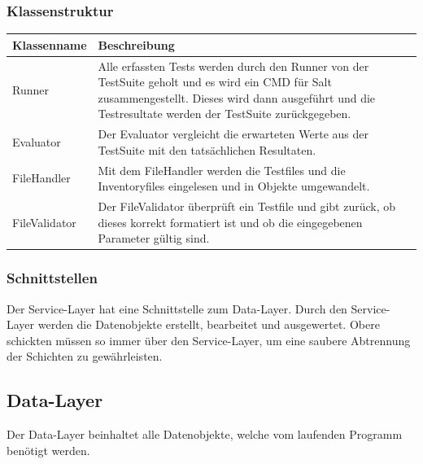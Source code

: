 \documentclass[a4,12pt]{scrartcl}
\begin{document}
\subsubsection{Klassenstruktur}
\begin{table}[H]
\centering
    \begin{tabular}{@{}l p{11cm} @{}}\toprule    
    {Klassenname} & {Beschreibung}\\ \midrule
    
    Runner & Alle erfassten Tests werden durch den Runner von der TestSuite geholt und es wird ein CMD für Salt zusammengestellt. Dieses wird dann ausgeführt und die Testresultate werden der TestSuite zurückgegeben.  \\       
    Evaluator & Der Evaluator vergleicht die erwarteten Werte aus der TestSuite mit den tatsächlichen Resultaten. \\
    FileHandler & Mit dem FileHandler werden die Testfiles und die Inventoryfiles eingelesen und in Objekte umgewandelt.\\
    FileValidator & Der FileValidator überprüft ein Testfile und gibt zurück, ob dieses korrekt formatiert ist und ob die eingegebenen Parameter gültig sind. \\

    \bottomrule
    \end{tabular}
\end{table}
\subsubsection{Schnittstellen}
Der Service-Layer hat eine Schnittstelle zum Data-Layer. Durch den Service-Layer werden die Datenobjekte erstellt, bearbeitet und ausgewertet. Obere schickten müssen so immer über den Service-Layer, um eine saubere Abtrennung der Schichten zu gewährleisten.



\subsection{Data-Layer}
Der Data-Layer beinhaltet alle Datenobjekte, welche vom laufenden Programm benötigt werden.
\end{document}
